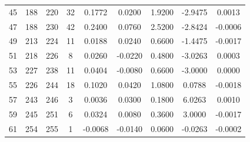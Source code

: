 \begin{table}[t]
\begin{tabular}{ccccccccc}
45 & 188 & 220 & 32 & 0.1772 & 0.0200 & 1.9200 & -2.9475 & 0.0013 \\
47 & 188 & 230 & 42 & 0.2400 & 0.0760 & 2.5200 & -2.8424 & -0.0006 \\
49 & 213 & 224 & 11 & 0.0188 & 0.0240 & 0.6600 & -1.4475 & -0.0017 \\
51 & 218 & 226 & 8 & 0.0260 & -0.0220 & 0.4800 & -3.0263 & 0.0003 \\
53 & 227 & 238 & 11 & 0.0404 & -0.0080 & 0.6600 & -3.0000 & 0.0000 \\
55 & 226 & 244 & 18 & 0.1020 & 0.0420 & 1.0800 & 0.0788 & -0.0018 \\
57 & 243 & 246 & 3 & 0.0036 & 0.0300 & 0.1800 & 6.0263 & 0.0010 \\
59 & 245 & 251 & 6 & 0.0324 & 0.0080 & 0.3600 & 3.0000 & -0.0017 \\
61 & 254 & 255 & 1 & -0.0068 & -0.0140 & 0.0600 & -0.0263 & -0.0002 \\
\hline
\end{tabular}
\end{table}
